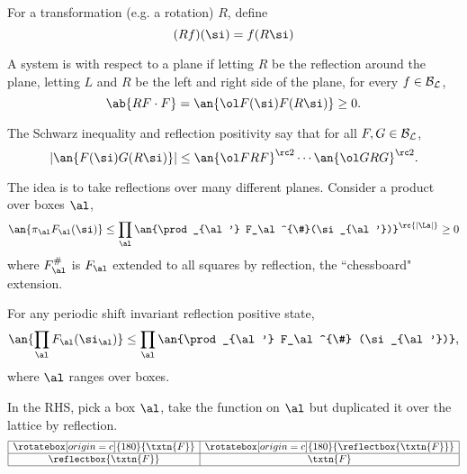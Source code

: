 For a transformation (e.g. a rotation) $R$, define
\[
(Rf)(\si) = f(R\si)
\]
\begin{df}
A system is  with respect to a plane if letting $R$ be the reflection around the plane, letting $L$ and $R$ be the left and right side of the plane, for every $f\in \cal B_L$,
\[
\ab{RF\cdot F} = \an{\ol F(\si)  F(R\si)}\ge 0.
\]
\end{df}
The Schwarz inequality and reflection positivity say that for all $F,G\in \cal B_L$, 
\[
|\an{F(\si)G(R\si)}| \le \an{\ol FRF}^{\rc 2} \cdots \an{\ol GRG}^{\rc 2}.
\]

The idea is to take reflections over many different planes. Consider a product over boxes $\al$,
\[
\an{\pi_\al F_{\al}(\si)} \le \prod_\al\an{\prod_{\al'} F_\al^{\#}(\si_{\al'})}^{\rc{|\La|}}\ge 0
\]
where $F_\al^{\#}$ is $F_\al$ extended to all squares by reflection, the ``chessboard" extension. %

\begin{thm}
For any periodic shift invariant reflection positive state, 
\[
\an{\prod_\al F_\al(\si_\al)} \le \prod_\al \an{\prod_{\al'} F_\al^{\#} (\si_{\al'})},
\]
where $\al$ ranges over boxes. 

In the RHS, pick a box $\al$, take the function on $\al$ but duplicated it over the lattice by reflection.
\[
\begin{array}{|c|c|}
\hline
\rotatebox[origin=c]{180}{\txtn{F}} &\rotatebox[origin=c]{180}{\reflectbox{\txtn{F}}} \\
\hline
\reflectbox{\txtn{F}}& \txtn{F}\\
\hline
\end{array}
\]
\end{thm}
